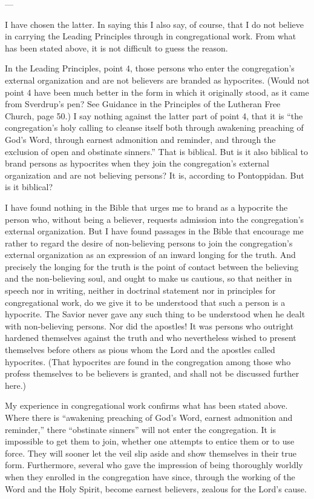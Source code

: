 ---

I have chosen the latter. In saying this I also say, of course, that I do not believe in carrying the Leading Principles through in congregational work. From what has been stated above, it is not difficult to guess the reason.

In the Leading Principles, point 4, those persons who enter the congregation’s external organization and are not believers are branded as hypocrites. (Would not point 4 have been much better in the form in which it originally stood, as it came from Sverdrup’s pen? See Guidance in the Principles of the Lutheran Free Church, page 50.) I say nothing against the latter part of point 4, that it is “the congregation’s holy calling to cleanse itself both through awakening preaching of God’s Word, through earnest admonition and reminder, and through the exclusion of open and obstinate sinners.” That is biblical. But is it also biblical to brand persons as hypocrites when they join the congregation’s external organization and are not believing persons? It is, according to Pontoppidan. But is it biblical?

I have found nothing in the Bible that urges me to brand as a hypocrite the person who, without being a believer, requests admission into the congregation’s external organization. But I have found passages in the Bible that encourage me rather to regard the desire of non-believing persons to join the congregation’s external organization as an expression of an inward longing for the truth. And precisely the longing for the truth is the point of contact between the believing and the non-believing soul, and ought to make us cautious, so that neither in speech nor in writing, neither in doctrinal statement nor in principles for congregational work, do we give it to be understood that such a person is a hypocrite. The Savior never gave any such thing to be understood when he dealt with non-believing persons. Nor did the apostles! It was persons who outright hardened themselves against the truth and who nevertheless wished to present themselves before others as pious whom the Lord and the apostles called hypocrites. (That hypocrites are found in the congregation among those who profess themselves to be believers is granted, and shall not be discussed further here.)

My experience in congregational work confirms what has been stated above. Where there is “awakening preaching of God’s Word, earnest admonition and reminder,” there “obstinate sinners” will not enter the congregation. It is impossible to get them to join, whether one attempts to entice them or to use force. They will sooner let the veil slip aside and show themselves in their true form. Furthermore, several who gave the impression of being thoroughly worldly when they enrolled in the congregation have since, through the working of the Word and the Holy Spirit, become earnest believers, zealous for the Lord’s cause.


